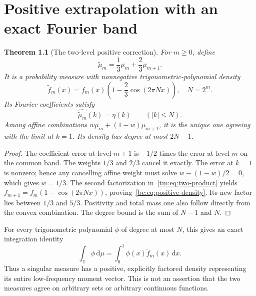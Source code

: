 \documentclass[11pt,a4paper,oneside,openany]{book}
\numberwithin{equation}{chapter}
\newtheorem{theorem}{Theorem}[chapter]
\theoremstyle{definition}
\theoremstyle{remark}
\newcommand{\T}{\mathbb T}
\newcommand{\dd}{\,\mathrm d}
\newcommand{\mt}{\widetilde\mu}
\newcommand{\ft}{\widetilde f}
\begin{document}
\chapter{Positive extrapolation with an exact Fourier band}
\label{bc:sec:positive}

\begin{theorem}[The two-level positive correction]
\label{bc:thm:positive}
For $m\ge0$, define
\begin{equation}
 \mt_m=\frac13\mu_m+\frac23\mu_{m+1}.
 \label{bc:eq:positive-combination}
\end{equation}
It is a probability measure with nonnegative trigonometric-polynomial density
\begin{equation}
 \boxed{\quad
 \ft_m(x)=f_m(x)\left(1-\frac23\cos(2\pi Nx)\right),\quad N=2^m.
 \quad}
 \label{bc:eq:positive-density}
\end{equation}
Its Fourier coefficients satisfy
\begin{equation}
 \widehat{\mt_m}(k)=\eta(k)\qquad (|k|\le N).
 \label{bc:eq:band-exact}
\end{equation}
Among affine combinations $w\mu_m+(1-w)\mu_{m+1}$, it is the unique one agreeing
with the limit at $k=1$. Its density has degree at most $2N-1$.
\end{theorem}
\begin{proof}
The coefficient error at level $m+1$ is $-1/2$ times the error at level $m$
on the common band. The weights $1/3$ and $2/3$ cancel it exactly. The error at
$k=1$ is nonzero; hence any cancelling affine weight must solve
$w-(1-w)/2=0$, which gives $w=1/3$. The second factorization
in~\eqref{tm:eq:two-product} yields
$f_{m+1}=f_m(1-\cos(2\pi Nx))$, proving~\eqref{bc:eq:positive-density}. Its new
factor lies between $1/3$ and $5/3$. Positivity and total mass one also follow
directly from the convex combination. The degree bound is the sum of $N-1$
and $N$.
\end{proof}

For every trigonometric polynomial $\phi$ of degree at most $N$, this gives an
exact integration identity
\begin{equation}
 \int_\T\phi\dd\mu=\int_0^1\phi(x)\ft_m(x)\dd x.
 \label{bc:eq:exact-quadrature}
\end{equation}
Thus a singular measure has a positive, explicitly factored density representing
its entire low-frequency moment vector. This is not an assertion that the two
measures agree on arbitrary sets or arbitrary continuous functions.
\end{document}
